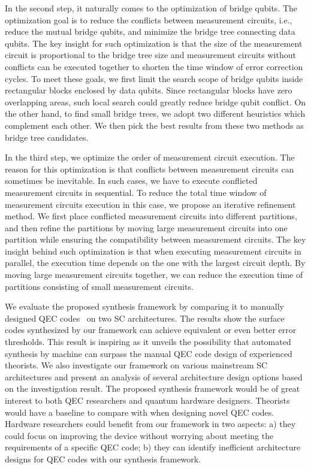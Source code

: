 In the second step, it naturally comes to the optimization of bridge qubits. The optimization goal is to reduce the conflicts between measurement circuits, i.e., reduce the mutual bridge qubits, and minimize the bridge tree connecting data qubits. The key insight for such optimization is that the size of the measurement circuit is proportional to the bridge tree size and measurement circuits without 
conflicts can be executed together to shorten the time window of error correction cycles. To meet these goals, we first limit the search scope of bridge qubits inside rectangular blocks enclosed by data qubits. Since rectangular blocks have zero overlapping areas, such local search could greatly reduce bridge qubit conflict. 
On the other hand, to find small bridge trees, we adopt two different 
heuristics which complement each other.
We then pick the best results from these two methods as bridge tree candidates.

In the third step, we optimize the order of measurement circuit execution. The reason for this optimization is that conflicts between measurement circuits can sometimes be inevitable. In such cases, we have to execute conflicted measurement circuits in sequential. To reduce the total time window of measurement circuits execution in this case, we propose an iterative refinement method. We first place conflicted measurement circuits into different partitions, and then refine the partitions by moving large measurement circuits into one partition while ensuring the compatibility between measurement circuits.
The key insight behind such optimization is that when executing measurement circuits in parallel, the execution time depends on the one with the largest circuit depth.  By moving large measurement circuits together, we can reduce the execution time of partitions consisting of small measurement circuits.

We evaluate the proposed synthesis framework by comparing it to manually designed QEC codes~\cite{Chamberland2020TopologicalAS} on two SC architectures. The results show the surface codes synthesized by our framework can achieve equivalent or even better error thresholds. This result is inspiring as it unveils the possibility that automated synthesis by machine can surpass the manual QEC code design of experienced theorists. 
We also investigate our framework on various mainstream SC architectures and present an analysis of several architecture design options based on the investigation result.
The proposed synthesis framework would be of great interest to both QEC researchers and quantum hardware designers.  
Theorists would have a baseline to compare with when designing novel QEC codes.
Hardware researchers could benefit from our framework in two aspects: a) they could focus on improving the device without worrying about meeting the requirements of a specific QEC code;
b) they can identify inefficient architecture designs for QEC codes with our synthesis framework.





